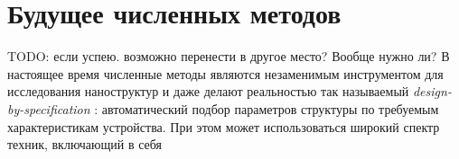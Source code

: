 \section{Будущее численных методов}

TODO: если успею. возможно перенести в другое место? Вообще нужно ли? В настоящее время численные методы являются незаменимым инструментом для исследования наноструктур и даже делают реальностью так называемый {\it design-by-specification} \cite{Piggott2015} : автоматический подбор параметров структуры по требуемым характеристикам устройства. При этом может использоваться широкий спектр техник, включающий в себя